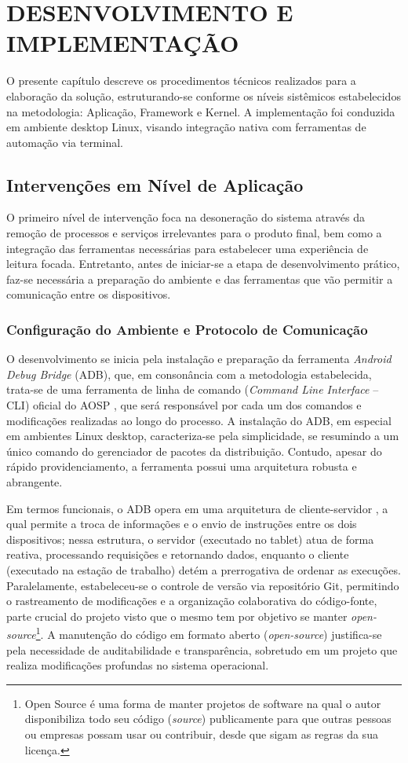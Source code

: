 \documentclass[
    12pt,
    openright,
    oneside,
    a4paper,
    english,
    brazilian
    ]{abntex2}
\begin{document}
\chapter{DESENVOLVIMENTO E IMPLEMENTAÇÃO} \label{cap:desenvolvimento} O presente capítulo descreve os procedimentos técnicos realizados para a elaboração da solução, estruturando-se conforme os níveis sistêmicos estabelecidos na metodologia: Aplicação, Framework e Kernel. A implementação foi conduzida em ambiente desktop Linux, visando integração nativa com ferramentas de automação via terminal. 

\section{Intervenções em Nível de Aplicação} O primeiro nível de intervenção foca na desoneração do sistema através da remoção de processos e serviços irrelevantes para o produto final, bem como a integração das ferramentas necessárias para estabelecer uma experiência de leitura focada. Entretanto, antes de iniciar-se a etapa de desenvolvimento prático, faz-se necessária a preparação do ambiente e das ferramentas que vão permitir a comunicação entre os dispositivos. 

\subsection{Configuração do Ambiente e Protocolo de Comunicação} O desenvolvimento se inicia pela instalação e preparação da ferramenta \textit{Android Debug Bridge} (ADB), que, em consonância com a metodologia estabelecida, trata-se de uma ferramenta de linha de comando (\textit{Command Line Interface} -- CLI) oficial do AOSP \cite{android2025}, que será responsável por cada um dos comandos e modificações realizadas ao longo do processo. A instalação do ADB, em especial em ambientes Linux desktop, caracteriza-se pela simplicidade, se resumindo a um único comando do gerenciador de pacotes da distribuição. Contudo, apesar do rápido providenciamento, a ferramenta possui uma arquitetura robusta e abrangente.

Em termos funcionais, o ADB opera em uma arquitetura de cliente-servidor \cite{tanenbaum2016}, a qual permite a troca de informações e o envio de instruções entre os dois dispositivos; nessa estrutura, o servidor (executado no tablet) atua de forma reativa, processando requisições e retornando dados, enquanto o cliente (executado na estação de trabalho) detém a prerrogativa de ordenar as execuções. Paralelamente, estabeleceu-se o controle de versão via repositório Git, permitindo o rastreamento de modificações e a organização colaborativa do código-fonte, parte crucial do projeto visto que o mesmo tem por objetivo se manter \textit{open-source}\footnote{Open Source é uma forma de manter projetos de software na qual o autor disponibiliza todo seu código (\textit{source}) publicamente para que outras pessoas ou empresas possam usar ou contribuir, desde que sigam as regras da sua licença.}. A manutenção do código em formato aberto (\textit{open-source}) justifica-se pela necessidade de auditabilidade e transparência, sobretudo em um projeto que realiza modificações profundas no sistema operacional.
\end{document}
